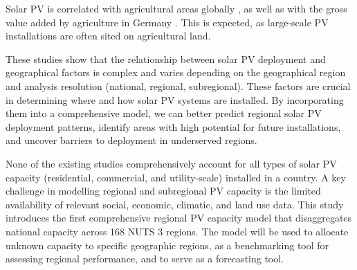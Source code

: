 Solar PV is correlated with agricultural areas globally \cite{kruitwagen_global_2021,alghanem_global_2024,van_de_ven_potential_2021}, as well as with the gross value added by agriculture in Germany \cite{mayer_deepsolar_2020}. This is expected, as large-scale PV installations are often sited on agricultural land.

These studies show that the relationship between solar PV deployment and geographical factors is complex and varies depending on the geographical region and analysis resolution (national, regional, subregional). These factors are crucial in determining where and how solar PV systems are installed. By incorporating them into a comprehensive model, we can better predict regional solar PV deployment patterns, identify areas with high potential for future installations, and uncover barriers to deployment in underserved regions.

None of the existing studies comprehensively account for all types of solar PV capacity (residential, commercial, and utility-scale) installed in a country. A key challenge in modelling regional and subregional PV capacity is the limited availability of relevant social, economic, climatic, and land use data. This study introduces the first comprehensive regional PV capacity model that disaggregates national capacity across 168 NUTS 3 regions. The model will be used to allocate unknown capacity to specific geographic regions, as a benchmarking tool for assessing regional performance, and to serve as a forecasting tool. 






